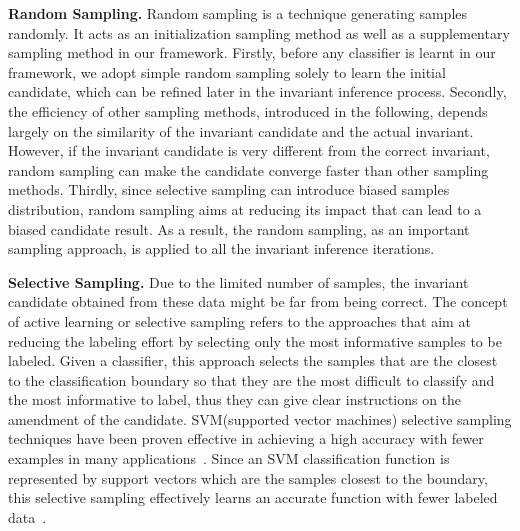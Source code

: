 \medskip\noindent
\textbf{Random Sampling.}
Random sampling is a technique generating samples randomly.
It acts as an initialization sampling method 
as well as a supplementary sampling method in our framework. 
Firstly, before any classifier is learnt in our framework, 
we adopt simple random sampling solely to learn the initial candidate, 
which can be refined later in the invariant inference process. 
Secondly, the efficiency of other sampling methods, introduced in the following, 
depends largely on the similarity of the invariant candidate and the actual invariant. 
However, if the invariant candidate is very different from the correct invariant, 
random sampling can make the candidate converge faster than other sampling methods. 
Thirdly, since selective sampling can introduce biased samples distribution, 
random sampling aims at reducing its impact that can lead to a biased candidate result. 
As a result, the random sampling, as an important sampling approach, 
is applied to all the invariant inference iterations. 

\medskip\noindent
\textbf{Selective Sampling.}
Due to the limited number of samples, 
the invariant candidate obtained from these data might be far from being correct. 
The concept of active learning or selective sampling refers to the approaches 
that aim at reducing the labeling effort by selecting only the most informative samples to be labeled.
Given a classifier, this approach selects the samples that are the closest to the classification boundary 
so that they are the most difficult to classify and the most informative to label,
thus they can give clear instructions on the amendment of the candidate.
SVM(supported vector machines) selective sampling techniques have been proven effective in achieving a high accuracy 
with fewer examples in many applications~\cite{DBLP:conf/mm/TongC01,DBLP:journals/jmlr/TongK01}. 
Since an SVM classification function is represented by support vectors which are the samples closest to the boundary, 
this selective sampling effectively learns an accurate function with fewer labeled data~\cite{DBLP:conf/icml/SchohnC00}.


